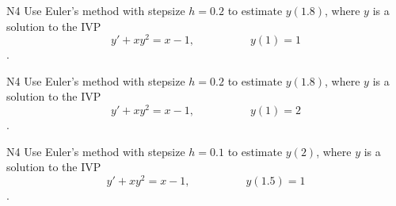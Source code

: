 \begin{problem}{N4}
Use Euler's method with stepsize \(h=0.2\) to estimate \(y(1.8)\), where \(y\) is a solution to the IVP
\[y'+xy^2=x-1,\hspace{5em}y(1)=1\].
\end{problem}

\begin{problem}{N4}
Use Euler's method with stepsize \(h=0.2\) to estimate \(y(1.8)\), where \(y\) is a solution to the IVP
\[y'+xy^2=x-1,\hspace{5em}y(1)=2\].
\end{problem}

\begin{problem}{N4}
Use Euler's method with stepsize \(h=0.1\) to estimate \(y(2)\), where \(y\) is a solution to the IVP
\[y'+xy^2=x-1,\hspace{5em}y(1.5)=1\].
\end{problem}
